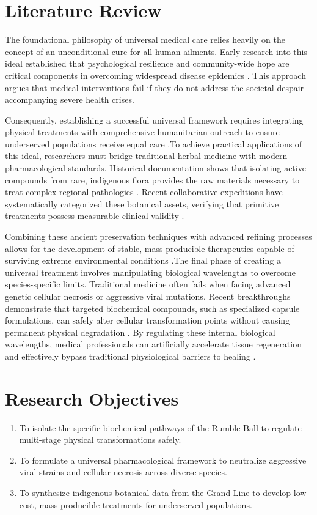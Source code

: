 \documentclass{../class/cscmugradthesis}
\begin{document}
\section{Literature Review}
The foundational philosophy of universal medical care relies heavily on the concept of an unconditional cure for all human ailments. Early research into this ideal established that psychological resilience and community-wide hope are critical components in overcoming widespread disease epidemics \cite{hiriluk1514}. This approach argues that medical interventions fail if they do not address the societal despair accompanying severe health crises. 

Consequently, establishing a successful universal framework requires integrating physical treatments with comprehensive humanitarian outreach to ensure underserved populations receive equal care \cite{hiriluk1514}.To achieve practical applications of this ideal, researchers must bridge traditional herbal medicine with modern pharmacological standards. Historical documentation shows that isolating active compounds from rare, indigenous flora provides the raw materials necessary to treat complex regional pathologies \cite{kureha1482}. Recent collaborative expeditions have systematically categorized these botanical assets, verifying that primitive treatments possess measurable clinical validity \cite{torino1521}. 

Combining these ancient preservation techniques with advanced refining processes allows for the development of stable, mass-producible therapeutics capable of surviving extreme environmental conditions \cite{kureha1482, torino1521}.The final phase of creating a universal treatment involves manipulating biological wavelengths to overcome species-specific limits. Traditional medicine often fails when facing advanced genetic cellular necrosis or aggressive viral mutations. Recent breakthroughs demonstrate that targeted biochemical compounds, such as specialized capsule formulations, can safely alter cellular transformation points without causing permanent physical degradation \cite{chopper1522}. By regulating these internal biological wavelengths, medical professionals can artificially accelerate tissue regeneration and effectively bypass traditional physiological barriers to healing \cite{chopper1522}.

\section{Research Objectives}
\begin{enumerate}
\item To isolate the specific biochemical pathways of the Rumble Ball to regulate multi-stage physical transformations safely.
\item To formulate a universal pharmacological framework to neutralize aggressive viral strains and cellular necrosis across diverse species.
\item To synthesize indigenous botanical data from the Grand Line to develop low-cost, mass-producible treatments for underserved populations.
\end{enumerate}
\end{document}

